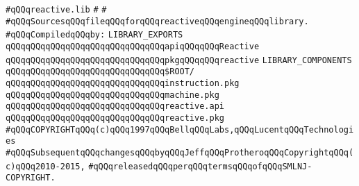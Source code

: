 \label{src/lib/reactive/reactive.lib}
\verb|#qQQqreactive.lib|\newline
\verb|#|\newline
\verb|#|\newline
\verb|#qQQqSourcesqQQqfileqQQqforqQQqreactiveqQQqengineqQQqlibrary.|\newline
\newline
\verb|#qQQqCompiledqQQqby:|\newline
\newline
\newline
\verb|LIBRARY_EXPORTS|\newline
\newline
\verb|qQQqqQQqqQQqqQQqqQQqqQQqqQQqqQQqapiqQQqqQQqReactive|\newline
\verb|qQQqqQQqqQQqqQQqqQQqqQQqqQQqqQQqpkgqQQqqQQqreactive|\newline
\newline
\newline
\newline
\verb|LIBRARY_COMPONENTS|\newline
\newline
\verb|qQQqqQQqqQQqqQQqqQQqqQQqqQQqqQQq$ROOT/|\newline
\newline
\verb|qQQqqQQqqQQqqQQqqQQqqQQqqQQqqQQqinstruction.pkg|\newline
\verb|qQQqqQQqqQQqqQQqqQQqqQQqqQQqqQQqmachine.pkg|\newline
\verb|qQQqqQQqqQQqqQQqqQQqqQQqqQQqqQQqreactive.api|\newline
\verb|qQQqqQQqqQQqqQQqqQQqqQQqqQQqqQQqreactive.pkg|\newline
\newline
\newline
\newline
\verb|#qQQqCOPYRIGHTqQQq(c)qQQq1997qQQqBellqQQqLabs,qQQqLucentqQQqTechnologies|\newline
\verb|#qQQqSubsequentqQQqchangesqQQqbyqQQqJeffqQQqProtheroqQQqCopyrightqQQq(c)qQQq2010-2015,|\newline
\verb|#qQQqreleasedqQQqperqQQqtermsqQQqofqQQqSMLNJ-COPYRIGHT.|\newline

